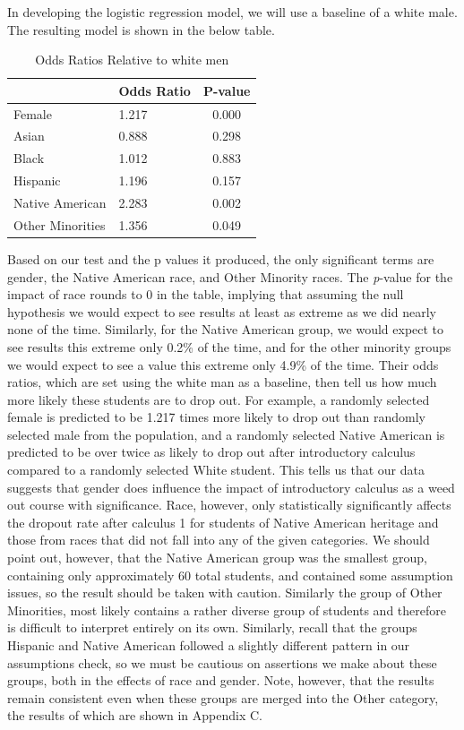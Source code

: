 \documentclass[]{article}
\begin{document}
In developing the logistic regression model, we will use a baseline of a
white male. The resulting model is shown in the below table.

\clearpage

\begin{table}[H]

\caption{\label{tab:odds_ratios}Odds Ratios Relative to white men}
\centering
\fontsize{12}{14}\selectfont
\begin{tabular}[t]{l|l|c}
\hline
  & Odds Ratio & P-value\\
\hline
Female & 1.217 & 0.000\\
\hline
Asian & 0.888 & 0.298\\
\hline
Black & 1.012 & 0.883\\
\hline
Hispanic & 1.196 & 0.157\\
\hline
Native American & 2.283 & 0.002\\
\hline
Other Minorities & 1.356 & 0.049\\
\hline
\end{tabular}
\end{table}

Based on our test and the p values it produced, the only significant
terms are gender, the Native American race, and Other Minority races.
The \emph{p}-value for the impact of race rounds to 0 in the table,
implying that assuming the null hypothesis we would expect to see
results at least as extreme as we did nearly none of the time.
Similarly, for the Native American group, we would expect to see results
this extreme only 0.2\% of the time, and for the other minority groups
we would expect to see a value this extreme only 4.9\% of the time.
Their odds ratios, which are set using the white man as a baseline, then
tell us how much more likely these students are to drop out. For
example, a randomly selected female is predicted to be 1.217 times more
likely to drop out than randomly selected male from the population, and
a randomly selected Native American is predicted to be over twice as
likely to drop out after introductory calculus compared to a randomly
selected White student. This tells us that our data suggests that gender
does influence the impact of introductory calculus as a weed out course
with significance. Race, however, only statistically significantly
affects the dropout rate after calculus 1 for students of Native
American heritage and those from races that did not fall into any of the
given categories. We should point out, however, that the Native American
group was the smallest group, containing only approximately 60 total
students, and contained some assumption issues, so the result should be
taken with caution. Similarly the group of Other Minorities, most likely
contains a rather diverse group of students and therefore is difficult
to interpret entirely on its own. Similarly, recall that the groups
Hispanic and Native American followed a slightly different pattern in
our assumptions check, so we must be cautious on assertions we make
about these groups, both in the effects of race and gender. Note,
however, that the results remain consistent even when these groups are
merged into the Other category, the results of which are shown in
Appendix C.
\end{document}
